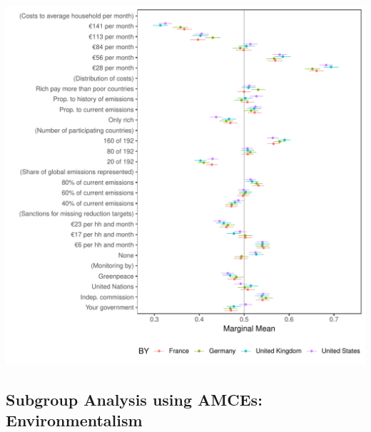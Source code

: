 \documentclass[a4paper,12pt]{article}\usepackage[]{graphicx}\usepackage[]{color}
\makeatletter
\def\maxwidth{ %
  \ifdim\Gin@nat@width>\linewidth
    \linewidth
  \else
    \Gin@nat@width
  \fi
}
\newenvironment{knitrout}{}{} %
\makeatother
\begin{document}
\begin{knitrout}
\color{fgcolor}
\includegraphics[width=\maxwidth]{figure/bechtel_subgroup_mm-1} 

\end{knitrout}




\clearpage

\subsection{Subgroup Analysis using AMCEs: Environmentalism}
\end{document}

